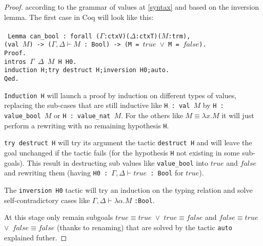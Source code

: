 \documentclass{article}
\begin{document}
    \begin{proof}
        according to the grammar of values at \ref{syntax} and based on the inversion lemma. The first case in Coq will look like this:\\\\
        \texttt{
Lemma can\_bool : forall ($\Gamma$:ctxV)($\Delta$:ctxT)($M$:trm),\\
                 (val $M$) -> ($\Gamma,\Delta\vdash M$ : Bool) ->
                (M = $true$  $\vee$  M = $false$).\\
Proof.\\
  intros $\Gamma$ $\Delta$ $M$ H H0.\\
  induction H;try destruct H;inversion H0;auto.\\
Qed.
        }\\\par
\texttt{Induction H} will launch a proof by induction on different types of values, replacing the sub-cases that are still inductive like \texttt{H : val $M$} by \texttt{H : value\_bool $M$} or \texttt{H : value\_nat $M$}. For the others like \texttt{$M\equiv\lambda x.M$} it will just perform a rewriting with no remaining hypothesis \texttt{H}.\par
\texttt{try destruct H} will try its argument the tactic \texttt{destruct H} and will leave the goal unchanged if the tactic fails (for the hypothesis \texttt{H} not existing in some sub-goals). This result in destructing sub values like \texttt{value\_bool} into $true$ and $false$ and rewriting them (having \texttt{H0 : $\Gamma,\Delta\vdash true$ : Bool} for $true$). \par
The \texttt{inversion H0} tactic will try an induction on the typing relation and solve self-contradictory cases like $\Gamma,\Delta\vdash\lambda\alpha.M$ \texttt{:Bool}.\par
At this stage only remain subgoals \texttt{$true\equiv true$ $\vee$ $true\equiv false$} and \texttt{$false\equiv true$ $\vee$ $false\equiv false$} (thanks to renaming) that are solved by the tactic \texttt{auto} explained futher.

    \end{proof}
        
\end{document}
